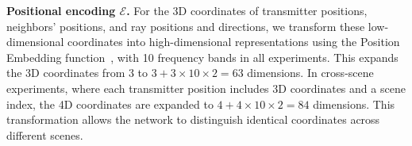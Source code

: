 \textbf{Positional encoding $\mathcal{E}$.}
For the 3D coordinates of transmitter positions, neighbors' positions, and ray positions and directions, we transform these low-dimensional coordinates into high-dimensional representations using the Position Embedding function~\cite{vaswani2017attention}, with 10 frequency bands in all experiments.
This expands the 3D coordinates from 3 to \( 3 + 3 \times 10 \times 2 = 63 \) dimensions.
In cross-scene experiments, where each transmitter position includes 3D coordinates and a scene index, the 4D coordinates are expanded to \( 4 + 4 \times 10 \times 2 = 84 \) dimensions.
This transformation allows the network to distinguish identical coordinates across different scenes.




